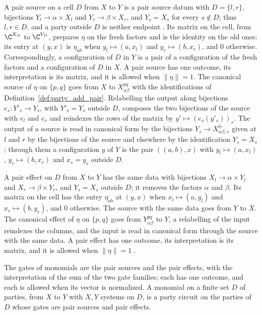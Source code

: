 \begin{definition}
    A pair source on a cell $D$ from $X$ to $Y$ is a pair source datum with
    $D=\{l,r\}$, bijections $Y_l\to\alpha\times X_l$ and $Y_r\to\beta\times X_r$, and
    $Y_s=X_s$ for every $s\notin D$; thus $l,r\in D$, and a party outside $D$ is neither
    endpoint \cite[Section~5.1]{OpenAI2026PolynomialPEPS}. Its matrix on the cell, from
    $\C^{X_D}$ to $\C^{Y_D}$, prepares $\eta$ on the fresh factors and is the identity
    on the old ones: its entry at $(y,x)$ is $\eta_{ab}$ when $y_l\mapsto(a,x_l)$ and
    $y_r\mapsto(b,x_r)$, and $0$ otherwise. Correspondingly, a configuration of $D$ in
    $Y$ is a pair of a configuration of the fresh factors and a configuration of $D$ in
    $X$. A pair source has one outcome, its interpretation is its matrix, and it is
    allowed when $\lVert\eta\rVert=1$. The canonical source of $\eta$ on $\{p,q\}$ goes
    from $X$ to $X^{pq}_{\alpha\beta}$ with the identifications of
    Definition~\ref{def:party_add_pair}. Relabelling the output along bijections
    $e_s\colon Y'_s\to Y_s$, with $Y'_s=Y_s$ outside $D$, composes the two bijections of
    the source with $e_l$ and $e_r$ and reindexes the rows of the matrix by
    $y'\mapsto(e_s(y'_s))_s$. The output of a source is read in canonical form by the
    bijections $Y_s\to X^{lr}_{\alpha\beta,s}$ given at $l$ and $r$ by the bijections of
    the source and elsewhere by the identification $Y_s=X_s$; through them a
    configuration $y$ of $Y$ is the pair $((a,b),x)$ with
    $y_l\mapsto(a,x_l)$, $y_r\mapsto(b,x_r)$ and $x_s=y_s$ outside $D$.

    A pair effect on $D$ from $X$ to $Y$ has the same data with bijections
    $X_l\to\alpha\times Y_l$ and $X_r\to\beta\times Y_r$, and $Y_s=X_s$ outside $D$; it
    removes the factors $\alpha$ and $\beta$. Its matrix on the cell has the entry
    $\overline{\eta_{ab}}$ at $(y,x)$ when $x_l\mapsto(a,y_l)$ and $x_r\mapsto(b,y_r)$,
    and $0$ otherwise. The source with the same data goes from $Y$ to $X$. The
    canonical effect of $\eta$ on $\{p,q\}$ goes from $Y^{pq}_{\alpha\beta}$ to $Y$, a
    relabelling of the input reindexes the columns, and the input is read in canonical
    form through the source with the same data. A pair effect has one outcome, its
    interpretation is its matrix, and it is allowed when $\lVert\eta\rVert=1$
    \cite[Section~5.1]{OpenAI2026PolynomialPEPS}.

    The gates of monomials are the pair sources and the pair effects, with the
    interpretation of the sum of the two gate families; each has one outcome, and each
    is allowed when its vector is normalized. A monomial on a finite set $D$ of parties,
    from $X$ to $Y$ with $X,Y$ systems on $D$, is a party circuit on the parties of $D$
    whose gates are pair sources and pair effects.
\end{definition}

